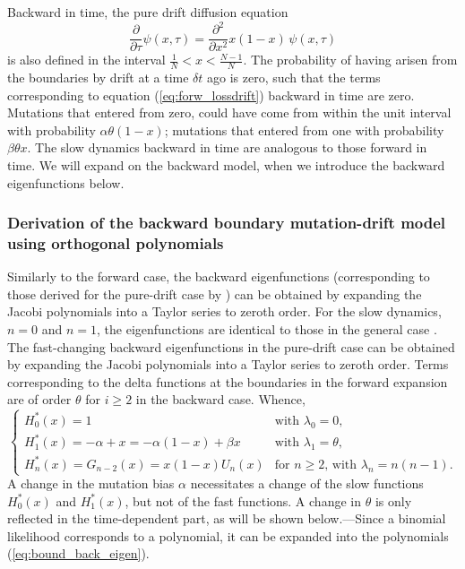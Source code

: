 \documentclass[preprint]{elsarticle}
\begin{document}
Backward in time, the pure drift diffusion equation
\begin{equation}\label{eq:backw_drift}
  \frac{\partial}{\partial \tau} \psi(x,\tau) =\frac{\partial^2}{\partial x^2}x(1-x)\,\psi(x,\tau) 
\end{equation}
is also defined in the interval $\frac1N<x<\frac{N-1}N$. The probability of having arisen from the boundaries by drift at a time $\delta t$ ago is zero, such that the terms corresponding to equation (\ref{eq:forw_lossdrift}) backward in time are zero. Mutations that entered from zero, could have come from within the unit interval with probability $\alpha\theta(1-x)$; mutations that entered from one with probability $\beta\theta x$. The slow dynamics backward in time are analogous to those forward in time. We will expand on the backward model, when we introduce the backward eigenfunctions below.

\subsubsection{Derivation of the backward boundary mutation-drift model using orthogonal polynomials}

Similarly to the forward case, the backward eigenfunctions (corresponding to those derived for the pure-drift case by \citet{Song12}) can be obtained by expanding the Jacobi polynomials into a Taylor series to zeroth order. For the slow dynamics, $n=0$ and $n=1$, the eigenfunctions are identical to those in the general case \citep{Song12}. The fast-changing backward eigenfunctions in the pure-drift case \citep{Song12} can be obtained by expanding the Jacobi polynomials into a Taylor series to zeroth order. Terms corresponding to the delta functions at the boundaries in the forward expansion are of order $\theta$ for $i\geq 2$ in the backward case. Whence,
\begin{equation}\label{eq:bound_back_eigen}
    \begin{cases}
    H_0^{*}(x)= 1 &\text{with $\lambda_0=0$,}\\
    H_1^{*}(x)=-\alpha+x=-\alpha(1- x) +\beta x &\text{with $\lambda_1=\theta$,}\\
    H_n^{*}(x)= G_{n-2}(x)=x(1-x)U_n(x) &\text{for $n\geq2$, with $\lambda_n=n(n-1)$.}
    \end{cases}
\end{equation}
A change in the mutation bias $\alpha$ necessitates a change of the slow functions $H_0^{*}(x)$ and $H_1^{*}(x)$, but not of the fast functions. A change in $\theta$ is only reflected in the time-dependent part, as will be shown below.---Since a binomial likelihood corresponds to a polynomial, it can be expanded into the polynomials (\ref{eq:bound_back_eigen}).
\end{document}
